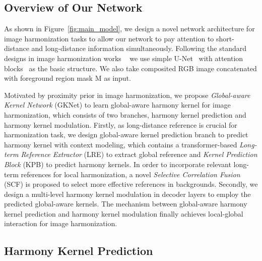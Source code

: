 \documentclass[10pt,twocolumn,letterpaper]{article}
\begin{document}
\subsection{Overview of Our Network}

As shown in Figure~\ref{fig:main_model}, we design a novel network architecture for image harmonization tasks to allow our network to pay attention to short-distance and long-distance information simultaneously. Following the standard designs in image harmonization works ~\cite{cun_2020_TIP,Sofiiuk_2021_WACV,Ling_2021_CVPR} we use simple U-Net~\cite{ronneberger2015u} with attention blocks~\cite{cun_2020_TIP} as the basic structure. We also take composited RGB image  concatenated with foreground region mask M  as input.

Motivated by proximity prior in image harmonization, we propose \emph{Global-aware Kernel Network} (GKNet) to learn global-aware harmony kernel for image harmonization, which consists of two branches, harmony kernel prediction and harmony kernel modulation. Firstly, as long-distance reference is crucial for harmonization task, we design global-aware kernel prediction branch to predict harmony kernel with context modeling, which contains a transformer-based \emph{Long-term Reference Extractor} (LRE) to extract global reference and \emph{Kernel Prediction Block} (KPB) to predict harmony kernels. In order to incorporate relevant long-term references for local harmonization, a novel \emph{Selective Correlation Fusion} (SCF) is proposed to select more effective references in backgrounds. Secondly, we design a multi-level harmony kernel modulation in decoder layers to employ the predicted global-aware kernels. The mechanism between global-aware harmony kernel prediction and harmony kernel modulation finally achieves local-global interaction for image harmonization.

\subsection{Harmony Kernel Prediction} 
\label{sec:HKP}
\end{document}
